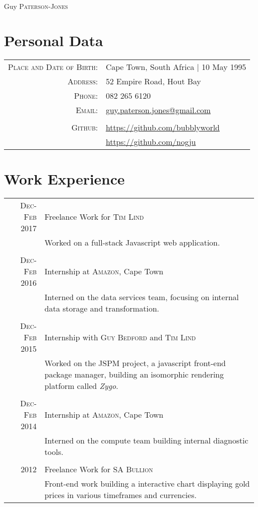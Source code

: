 \documentclass[a4paper,10pt]{article}
\begin{document}
\pagestyle{empty} %

\par{\centering
		{\Huge Guy \textsc{Paterson-Jones}
	}\bigskip\par}

\section{Personal Data}

\begin{tabular}{rl}
    \textsc{Place and Date of Birth:} & Cape Town, South Africa  | 10 May 1995 \\
    \textsc{Address:}   & 52 Empire Road, Hout Bay \\
    \textsc{Phone:}     & 082 265 6120\\
    \textsc{Email:}     & \href{mailto:guy.paterson.jones@gmail.com}{guy.paterson.jones@gmail.com} \\ \\
    \textsc{Github:} & \href{https://github.com/bubblyworld}{https://github.com/bubblyworld} \\
    & \href{https://github.com/nogju}{https://github.com/nogju}
\end{tabular}

\section{Work Experience}
\begin{tabular}{r|p{11cm}}
\textsc{Dec-Feb 2017} & Freelance Work for \textsc{Tim Lind} \\&\footnotesize{Worked on a full-stack Javascript web application. }\\\multicolumn{2}{c}{} \\
 \textsc{Dec-Feb 2016} & Internship at \textsc{Amazon}, Cape Town \\&\footnotesize{Interned on the data services team, focusing on internal data storage and transformation.}\\\multicolumn{2}{c}{} \\
 \textsc{Dec-Feb 2015}&{Internship with \textsc{Guy Bedford} and \textsc{Tim Lind}}\\&\footnotesize{Worked on the JSPM project, a javascript front-end package manager, building an isomorphic rendering platform called \emph{Zygo}.}\\\multicolumn{2}{c}{} \\
 \textsc{Dec-Feb 2014} & Internship at \textsc{Amazon}, Cape Town \\&\footnotesize{Interned on the compute team building internal diagnostic tools.}\\\multicolumn{2}{c}{} \\
 
\textsc{2012} & Freelance Work for \textsc{SA Bullion}
\\&\footnotesize{Front-end work building a interactive chart displaying gold prices in various timeframes and currencies.}
\end{tabular}
\end{document}
